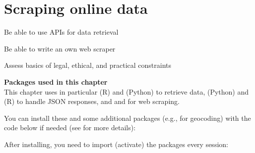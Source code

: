 \chapter{Scraping online data}
\label{chap:scraping}

\begin{abstract}{Abstract}
In this chapter, you learn how to retrieve your data from online sources. We first discuss the use of application programming interfaces, so-called APIs, which allow you to retrieve data from social media platforms, but also government data or other forms of open data, in a machine-readable format. We then discuss how to do web scraping in a narrower sense to retrieve data from websites that do not offer an API. We also discuss how to deal with authentication mechanisms, cookies, and the like, as well as ethical, legal, and practical considerations.
\end{abstract}



\begin{objectives}
\item Be able to use APIs for data retrieval
\item Be able to write an own web scraper
\item Assess basics of legal, ethical, and practical constraints
\end{objectives}


\newpage
\begin{feature}
  \textbf{Packages used in this chapter}\\
  This chapter uses in particular  (R) and  (Python) to retrieve data,  (Python) and  (R) to handle JSON responses, and  and  for web scraping.

You can install these and some additional packages (e.g., for geocoding) with the code below if needed  (see  for more details):


\noindent After installing, you need to import (activate) the packages every session:

\end{feature}











